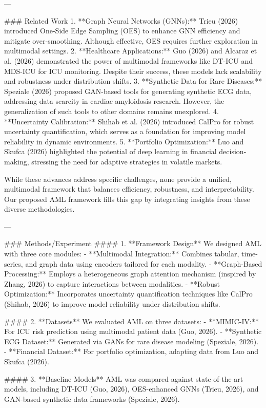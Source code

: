 ---

### Related Work  
1. **Graph Neural Networks (GNNs):** Trieu (2026) introduced One-Side Edge Sampling (OES) to enhance GNN efficiency and mitigate over-smoothing. Although effective, OES requires further exploration in multimodal settings.  
2. **Healthcare Applications:** Guo (2026) and Alcaraz et al. (2026) demonstrated the power of multimodal frameworks like DT-ICU and MDS-ICU for ICU monitoring. Despite their success, these models lack scalability and robustness under distribution shifts.  
3. **Synthetic Data for Rare Diseases:** Speziale (2026) proposed GAN-based tools for generating synthetic ECG data, addressing data scarcity in cardiac amyloidosis research. However, the generalization of such tools to other domains remains unexplored.  
4. **Uncertainty Calibration:** Shihab et al. (2026) introduced CalPro for robust uncertainty quantification, which serves as a foundation for improving model reliability in dynamic environments.  
5. **Portfolio Optimization:** Luo and Skufca (2026) highlighted the potential of deep learning in financial decision-making, stressing the need for adaptive strategies in volatile markets.  

While these advances address specific challenges, none provide a unified, multimodal framework that balances efficiency, robustness, and interpretability. Our proposed AML framework fills this gap by integrating insights from these diverse methodologies.

---

### Methods/Experiment  
#### 1. **Framework Design**  
We designed AML with three core modules:  
- **Multimodal Integration:** Combines tabular, time-series, and graph data using encoders tailored for each modality.  
- **Graph-Based Processing:** Employs a heterogeneous graph attention mechanism (inspired by Zhang, 2026) to capture interactions between modalities.  
- **Robust Optimization:** Incorporates uncertainty quantification techniques like CalPro (Shihab, 2026) to improve model reliability under distribution shifts.

#### 2. **Datasets**  
We evaluated AML on three datasets:  
- **MIMIC-IV:** For ICU risk prediction using multimodal patient data (Guo, 2026).  
- **Synthetic ECG Dataset:** Generated via GANs for rare disease modeling (Speziale, 2026).  
- **Financial Dataset:** For portfolio optimization, adapting data from Luo and Skufca (2026).

#### 3. **Baseline Models**  
AML was compared against state-of-the-art models, including DT-ICU (Guo, 2026), OES-enhanced GNNs (Trieu, 2026), and GAN-based synthetic data frameworks (Speziale, 2026).


